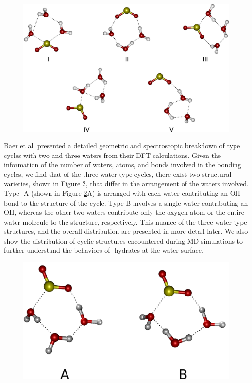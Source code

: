 \begin{figure}[h!]
	\begin{center}
		\includegraphics[scale=1.0]{images/cycles/cycle-types-small.png}
		\caption{}
		\label{fig:cyclic-structures}
	\end{center}
\end{figure}

Baer et al. presented a detailed geometric and spectroscopic breakdown of type  cycles with two and three waters from their DFT calculations.\cite{Baer2010} Given the information of the number of waters, atoms, and bonds involved in the bonding cycles, we find that of the three-water type  cycles, there exist two structural varieties, shown in Figure \ref{fig:type-3-varieties}, that differ in the arrangement of the waters involved. Type -A (shown in Figure \ref{fig:type-3-varieties}A) is arranged with each water contributing an OH bond to the structure of the cycle. Type B involves a single water contributing an OH, whereas the other two waters contribute only the oxygen atom or the entire water molecule to the structure, respectively. This nuance of the three-water type  structures, and the overall distribution are presented in more detail later. We also show the distribution of cyclic structures encountered during MD simulations to further understand the behaviors of \suldiox-hydrates at the water surface.

\begin{figure}[h!]
	\begin{center}
		\includegraphics[scale=1.0]{images/cycles/triple-cycle-types-small.png}
		\caption{}
		\label{fig:type-3-varieties}
	\end{center}
\end{figure}
